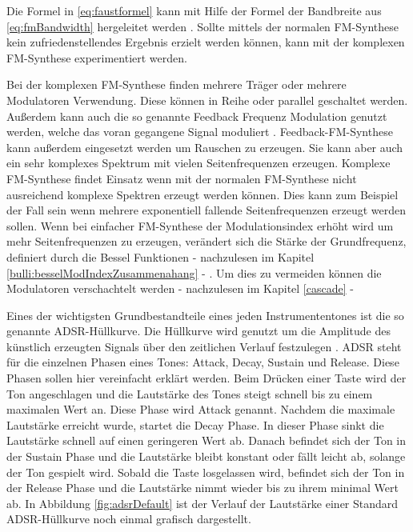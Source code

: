 Die Formel in \ref{eq:faustformel} kann mit Hilfe der Formel der Bandbreite aus \ref{eq:fmBandwidth} hergeleitet werden \cite[S. 221]{lathi}. Sollte mittels der normalen FM-Synthese kein zufriedenstellendes Ergebnis erzielt werden können, kann mit der komplexen FM-Synthese experimentiert werden. 

Bei der komplexen FM-Synthese finden mehrere Träger oder mehrere Modulatoren Verwendung. Diese können in Reihe oder parallel geschaltet werden. Außerdem kann auch die so genannte Feedback Frequenz Modulation genutzt werden, welche das voran gegangene Signal moduliert \cite[S. 399 f.]{hornerPaper}. Feedback-FM-Synthese kann außerdem eingesetzt werden um Rauschen zu erzeugen. Sie kann aber auch ein sehr komplexes Spektrum mit vielen Seitenfrequenzen erzeugen. Komplexe FM-Synthese findet Einsatz wenn mit der normalen FM-Synthese nicht ausreichend komplexe Spektren erzeugt werden können. Dies kann zum Beispiel der Fall sein wenn mehrere exponentiell fallende Seitenfrequenzen erzeugt werden sollen. Wenn bei einfacher FM-Synthese der Modulationsindex erhöht wird um mehr Seitenfrequenzen zu erzeugen, verändert sich die Stärke der Grundfrequenz, definiert durch die Bessel Funktionen - nachzulesen im Kapitel \ref{bulli:besselModIndexZusammenahang} - . Um dies zu vermeiden können die Modulatoren verschachtelt werden - nachzulesen im Kapitel \ref{cascade} - 

Eines der wichtigsten Grundbestandteile eines jeden Instrumententones ist die so genannte ADSR-Hüllkurve. Die Hüllkurve wird genutzt um die Amplitude des künstlich erzeugten Signals über den zeitlichen Verlauf festzulegen \cite[S. 532f]{chowningPaper}. ADSR steht für die einzelnen Phasen eines Tones: Attack, Decay, Sustain und Release. Diese Phasen sollen hier vereinfacht erklärt werden. Beim Drücken einer Taste wird der Ton angeschlagen und die Lautstärke des Tones steigt schnell bis zu einem maximalen Wert an. Diese Phase wird Attack genannt. Nachdem die maximale Lautstärke erreicht wurde, startet die Decay Phase. In dieser Phase sinkt die Lautstärke schnell auf einen geringeren Wert ab. Danach befindet sich der Ton in der Sustain Phase und die Lautstärke bleibt konstant oder fällt leicht ab, solange der Ton gespielt wird. Sobald die Taste losgelassen wird, befindet sich der Ton in der Release Phase und die Lautstärke nimmt wieder bis zu ihrem minimal Wert ab. In Abbildung \ref{fig:adsrDefault} ist der Verlauf der Lautstärke einer Standard ADSR-Hüllkurve noch einmal grafisch dargestellt.

